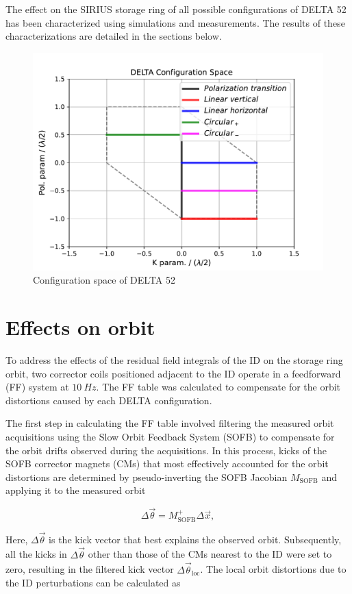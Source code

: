 \documentclass[a4paper,
               keeplastbox,   %
               ]{jacow}
\begin{document}
The effect on the SIRIUS storage ring of all possible configurations of DELTA 52 has been characterized using simulations and measurements. The results of these characterizations are detailed in the sections below.

\begin{figure}[]
    \centering
   \includegraphics[width=.8\columnwidth]{config_space.pdf}
   \caption{Configuration space of DELTA 52}
   \label{fig:config_space}
\end{figure}

\section{Effects on orbit}

To address the effects of the residual field integrals of the ID on the storage ring orbit, two corrector coils positioned adjacent to the ID operate in a feedforward (FF) system at $\SI{10}{Hz}$. The FF table was calculated to compensate for the orbit distortions caused by each DELTA configuration.

The first step in calculating the FF table involved filtering the measured orbit acquisitions using the Slow Orbit Feedback System (SOFB) to compensate for the orbit drifts observed during the acquisitions. In this process, kicks of the SOFB corrector magnets (CMs) that most effectively accounted for the orbit distortions are determined by pseudo-inverting the SOFB Jacobian $M_{\text{SOFB}}$ and applying it to the measured orbit


\begin{equation}
    \Delta\vec{\theta} = M_{\text{SOFB}}^{+}\Delta\vec{x},
\end{equation}

Here, $\Delta\vec{\theta}$ is the kick vector that best explains the observed orbit.  Subsequently, all the kicks in $\Delta\vec{\theta}$ other than those of the CMs nearest to the ID were set to zero, resulting in the filtered kick vector $\Delta\vec{\theta}_{\text{loc}}$. The local orbit distortions due to the ID perturbations can be calculated as
\end{document}
